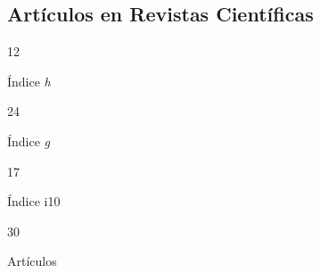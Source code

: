 \documentclass[11pt,a4paper,]{awesome-cv}
\begin{document}
\hypertarget{artuxedculos-en-revistas-cientuxedficas}{%
\subsection{Artículos en Revistas
Científicas}\label{artuxedculos-en-revistas-cientuxedficas}}

\begin{tcolorbox}[enhanced,
        on line, 
        boxsep=4pt, left=0pt,right=0pt,top=0pt,bottom=0pt,
        colframe=white,colback=blue,
        hyperurl={https://scholar.google.com/citations?user=8Q0jKHsAAAAJ}]
  
\color{white}
\begin{minipage}[c]{0.15\linewidth}
  \begin{center} \begin{huge} 12 \end{huge}
  \begin{small} Índice \textit{h} \end{small} \end{center} 
\end{minipage} \begin{minipage}[c]{0.15\linewidth}
  \begin{center} \begin{huge} 24 \end{huge}
  \begin{small} Índice \textit{g} \end{small} \end{center}
\end{minipage} \begin{minipage}[c]{0.17\linewidth}
  \begin{center} \begin{huge} 17 \end{huge}
  \begin{small} Índice i10 \end{small} \end{center}
\end{minipage} \begin{minipage}[c]{0.20\linewidth}
  \begin{center} \begin{huge} 30 \end{huge}
  \begin{small} Artículos \end{small} \end{center}
\end{minipage} \begin{minipage}[c]{0.12\linewidth}

\end{minipage}
\end{tcolorbox}
\end{document}
